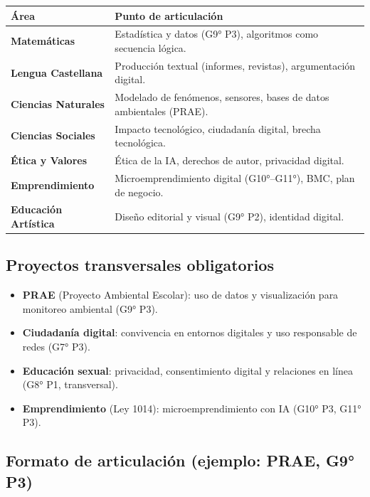 \documentclass[12pt, a4paper]{article}
\begin{document}
\begin{center}
\begin{tabular}{|L{4cm}|L{10cm}|}
\hline
{}
\color{white}\textbf{Área} &
\color{white}\textbf{Punto de articulación} \\
\hline
\textbf{Matemáticas} &
Estadística y datos (G9° P3), algoritmos como secuencia lógica. \\
\hline
\textbf{Lengua Castellana} &
Producción textual (informes, revistas), argumentación digital. \\
\hline
\textbf{Ciencias Naturales} &
Modelado de fenómenos, sensores, bases de datos ambientales (PRAE). \\
\hline
\textbf{Ciencias Sociales} &
Impacto tecnológico, ciudadanía digital, brecha tecnológica. \\
\hline
\textbf{Ética y Valores} &
Ética de la IA, derechos de autor, privacidad digital. \\
\hline
\textbf{Emprendimiento} &
Microemprendimiento digital (G10°–G11°), BMC, plan de negocio. \\
\hline
\textbf{Educación Artística} &
Diseño editorial y visual (G9° P2), identidad digital. \\
\hline
\end{tabular}
\end{center}

\subsection{Proyectos transversales obligatorios}

\begin{itemize}
  \item \textbf{PRAE} (Proyecto Ambiental Escolar): uso de datos y visualización
    para monitoreo ambiental (G9° P3).
  \item \textbf{Ciudadanía digital}: convivencia en entornos digitales y uso
    responsable de redes (G7° P3).
  \item \textbf{Educación sexual}: privacidad, consentimiento digital y relaciones
    en línea (G8° P1, transversal).
  \item \textbf{Emprendimiento} (Ley 1014): microemprendimiento con IA
    (G10° P3, G11° P3).
\end{itemize}

\subsection{Formato de articulación (ejemplo: PRAE, G9° P3)}
\end{document}

